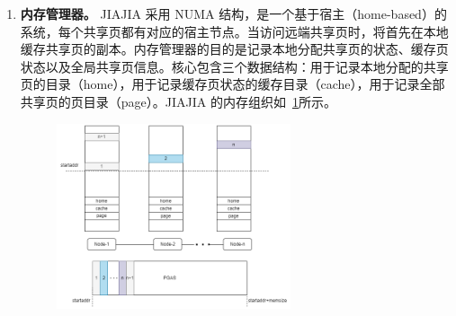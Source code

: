 {\begin{enumerate}[label=\arabic*.]
    \item \textbf{内存管理器。} JIAJIA 采用 NUMA 结构，是一个基于宿主（home-based）的系统，每个共享页都有对应的宿主节点。当访问远端共享页时，将首先在本地缓存共享页的副本。内存管理器的目的是记录本地分配共享页的状态、缓存页状态以及全局共享页信息。核心包含三个数据结构：用于记录本地分配的共享页的目录（home），用于记录缓存页状态的缓存目录（cache），用于记录全部共享页的页目录（page）。JIAJIA 的内存组织如~\ref{fig:JIAJIA-memory}所示。
    \begin{figure}[!htbp]
        \centering
        \includegraphics[width=0.65\textwidth]{Img/JIAJIA-memory.png}
        \label{fig:JIAJIA-memory}
    \end{figure}
    

\end{enumerate}}
